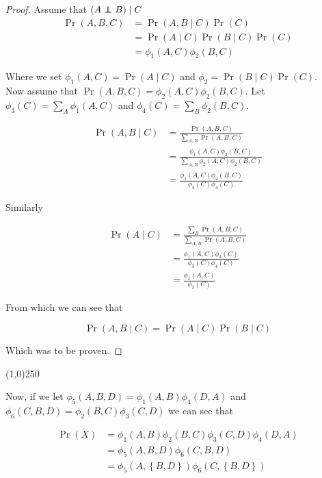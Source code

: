 \documentclass{article}
\newcommand\independent{\protect\mathpalette{\protect\independenT}{\perp}}
\def\independenT#1#2{\mathrel{\rlap{$#1#2$}\mkern2mu{#1#2}}}
\begin{document}
\begin{proof}
Assume that $(A\independent B) \mid C$
\begin{align}
\Pr(A,B,C) &= \Pr(A,B \mid C)\Pr(C) \\
&= \Pr(A \mid C)\Pr(B \mid C)\Pr(C) \\
&= \phi_1(A,C)\phi_2(B,C)
\end{align}

Where we set $\phi_1(A,C) = \Pr(A \mid C)$ and $\phi_2 = \Pr(B \mid
C)\Pr(C)$. \\

Now assume that $\Pr(A,B,C) = \phi_2(A,C)\phi_2(B,C)$. Let
$\phi_3(C)=\sum_A\phi_1(A,C)$ and $\phi_4(C)=\sum_B\phi_2(B,C)$.

\begin{align}
\Pr(A,B \mid C) &= \frac{\Pr(A,B,C)}{\sum_{A,B}\Pr(A,B,C)} \\
&= \frac{\phi_1(A,C)\phi_2(B,C)}{\sum_{A,B}\phi_2(A,C)\phi_2(B,C)} \\
&= \frac{\phi_1(A,C)\phi_2(B,C)}{\phi_3(C)\phi_4(C)}
\end{align}

Similarly

\begin{align}
\Pr(A \mid C) &= \frac{\sum_B\Pr(A,B,C)}{\sum_{A,B}\Pr(A,B,C)} \\
&= \frac{\phi_1(A,C)\phi_4(C)}{\phi_3(C)\phi_4(C)} \\
&= \frac{\phi_1(A,C)}{\phi_3(C)}
\end{align}

From which we can see that 

\begin{equation}
\Pr(A,B \mid C) = \Pr(A \mid C)\Pr(B \mid C)
\end{equation}

Which was to be proven.
\end{proof}

\begin{center}
\line(1,0){250}
\end{center}


Now, if we let $\phi_5(A,B,D) = \phi_1(A,B)\phi_4(D,A)$ and $\phi_6(C,B,D) = \phi_2(B,C)\phi_3(C,D)$ we can see that 

\begin{align}
\Pr(X) &= \phi_1(A,B)\phi_2(B,C)\phi_3(C,D)\phi_4(D,A) \\
&= \phi_5(A,B,D)\phi_6(C,B,D) \\
&= \phi_5(A,\left\{B,D\right\})\phi_6(C,\left\{B,D\right\})
\end{align}
\end{document}
